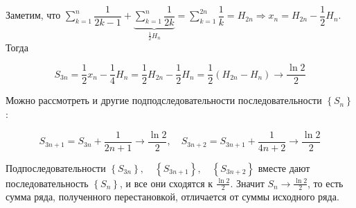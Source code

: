 \documentclass[../main.tex]{subfiles}
\begin{document}
\begin{example}
    Заметим, что \( \sum\limits_{ k=1}^{ n} \dfrac{ 1}{ 2k-1} + \underbrace{\sum\limits_{ k=1}^{ n} \dfrac{ 1}{ 2k}}_{ \frac{ 1}{ 2}H_n } = \sum\limits_{ k=1}^{ 2n} \dfrac{ 1}{ k} = H_{2n} \Longrightarrow x_n= H_{2n}- \dfrac{ 1}{ 2} H_n\). Тогда 

    \[ S_{3n}=\dfrac{ 1}{ 2} x_n- \dfrac{ 1}{ 4} H_n= \dfrac{ 1}{ 2} H_{2n}- \dfrac{ 1}{ 2} H_n = \dfrac{ 1}{ 2} \left( H_{2n}-H_n\right) \longrightarrow \dfrac{ \ln2}{ 2} \]

    Можно рассмотреть и другие подподследовательности последовательности \( \left\{ S_n\right\}\):

    \[ S_{3n+1}= S_{3n}+ \dfrac{ 1}{ 2n+1} \longrightarrow \dfrac{ \ln2}{ 2},\quad S_{3n+2}=S_{3n+1}+ \dfrac{ 1}{ 4n+2} \longrightarrow \dfrac{ \ln2}{ 2} \]

    Подпоследовательности \( \left\{ S_{3n}\right\},\quad \left\{ S_{3n+1}\right\},\quad \left\{ S_{3n+2}\right\}\) вместе дают последовательность \( \left\{ S_n\right\} \), и все они сходятся к \( \frac{ \ln2}{ 2} \). Значит \( S_n \longrightarrow \frac{ \ln2}{ 2} \), то есть сумма ряда, полученного перестановкой, отличается от суммы исходного ряда. 
\end{example}
\end{document}
